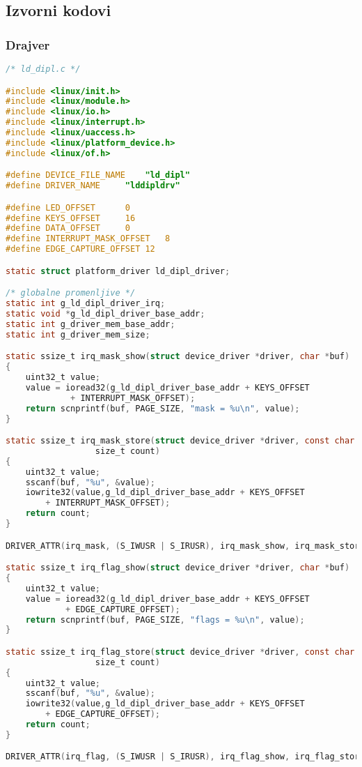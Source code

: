 
\subsection{Izvorni kodovi}
\subsubsection{Drajver}
\begin{lstlisting}[language=C]
/* ld_dipl.c */

#include <linux/init.h>
#include <linux/module.h>
#include <linux/io.h>
#include <linux/interrupt.h>
#include <linux/uaccess.h>
#include <linux/platform_device.h>
#include <linux/of.h>

#define DEVICE_FILE_NAME	"ld_dipl"
#define DRIVER_NAME		"lddipldrv"

#define LED_OFFSET		0
#define KEYS_OFFSET		16
#define DATA_OFFSET		0
#define INTERRUPT_MASK_OFFSET	8
#define EDGE_CAPTURE_OFFSET	12

static struct platform_driver ld_dipl_driver;

/* globalne promenljive */
static int g_ld_dipl_driver_irq;
static void *g_ld_dipl_driver_base_addr;
static int g_driver_mem_base_addr;
static int g_driver_mem_size;

static ssize_t irq_mask_show(struct device_driver *driver, char *buf)
{	
	uint32_t value;
	value = ioread32(g_ld_dipl_driver_base_addr + KEYS_OFFSET
			 + INTERRUPT_MASK_OFFSET);
	return scnprintf(buf, PAGE_SIZE, "mask = %u\n", value);
}

static ssize_t irq_mask_store(struct device_driver *driver, const char *buf,
			      size_t count)
{
	uint32_t value;
	sscanf(buf, "%u", &value);
	iowrite32(value,g_ld_dipl_driver_base_addr + KEYS_OFFSET
		+ INTERRUPT_MASK_OFFSET);
	return count;
}

DRIVER_ATTR(irq_mask, (S_IWUSR | S_IRUSR), irq_mask_show, irq_mask_store);

static ssize_t irq_flag_show(struct device_driver *driver, char *buf)
{
	uint32_t value;
	value = ioread32(g_ld_dipl_driver_base_addr + KEYS_OFFSET
			+ EDGE_CAPTURE_OFFSET);
	return scnprintf(buf, PAGE_SIZE, "flags = %u\n", value);
}

static ssize_t irq_flag_store(struct device_driver *driver, const char *buf,
			      size_t count)
{
	uint32_t value;
	sscanf(buf, "%u", &value);
	iowrite32(value,g_ld_dipl_driver_base_addr + KEYS_OFFSET
		+ EDGE_CAPTURE_OFFSET);
	return count;
}

DRIVER_ATTR(irq_flag, (S_IWUSR | S_IRUSR), irq_flag_show, irq_flag_store);


\end{lstlisting}
